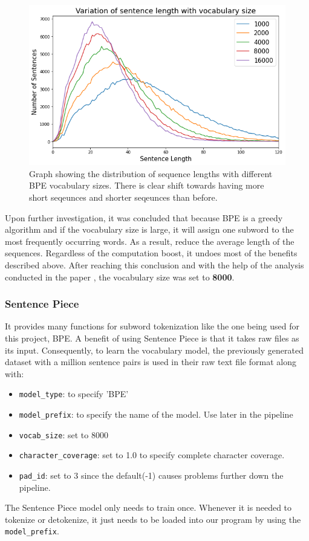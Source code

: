 \documentclass[12pt,a4paper,twoside,openright]{report}
\begin{document}
\begin{figure}
    \centering
    \includegraphics[width=\textwidth*3/4]{figs/length-vs-vocab-size.png}
    \caption{Graph showing the distribution of sequence lengths with different BPE vocabulary sizes. There is clear shift towards having more short seqeunces and shorter seqeunces than before.}
    \label{fig:sentence-length-vs-vocab-size}
\end{figure}
Upon further investigation, it was concluded that because BPE is a greedy algorithm and if the vocabulary size is large, it will assign one subword to the most frequently occurring words. As a result, reduce the average length of the sequences. Regardless of the computation boost, it undoes most of the benefits described above. After reaching this conclusion and with the help of the analysis conducted in the paper \cite{vocabsize}, the vocabulary size was set to \textbf{8000}.
\subsubsection{Sentence Piece}

It provides many functions for subword tokenization like the one being used for this project, BPE. A benefit of using Sentence Piece is that it takes raw files as its input. Consequently, to learn the vocabulary model, the previously generated dataset with a million sentence pairs is used in their raw text file format along with:
\begin{itemize}
    \item \lstinline{model_type}: to specify 'BPE'
    \item \lstinline{model_prefix}: to specify the name of the model. Use later in the pipeline
    \item \lstinline{vocab_size}: set to 8000
    \item \lstinline{character_coverage}: set to 1.0 to specify complete character coverage.
    \item \lstinline{pad_id}: set to 3 since the default(-1) causes problems further down the pipeline.

\end{itemize}
The Sentence Piece model only needs to train once. Whenever it is needed to tokenize or detokenize, it just needs to be loaded into our program by using the \lstinline{model_prefix}.
\end{document}
